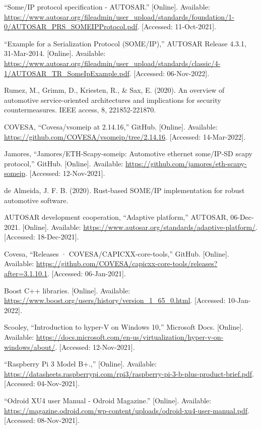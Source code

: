 \documentclass[a4paper, 12pt, oneside, BCOR1cm,toc=chapterentrywithdots]{scrbook}
\begin{document}
\begin{thebibliography}{00}
“Some/IP protocol specification - AUTOSAR.” [Online]. Available: \url{https://www.autosar.org/fileadmin/user\_upload/standards/foundation/1-0/AUTOSAR\_PRS\_SOMEIPProtocol.pdf}. [Accessed: 11-Oct-2021]. 

“Example for a Serialization Protocol (SOME/IP),” AUTOSAR Release 4.3.1, 31-Mar-2014. [Online]. Available: \url{https://www.autosar.org/fileadmin/user\_upload/standards/classic/4-1/AUTOSAR\_TR\_SomeIpExample.pdf}. [Accessed: 06-Nov-2022]. 

Rumez, M., Grimm, D., Kriesten, R., \& Sax, E. (2020). An overview of automotive service-oriented architectures and implications for security countermeasures. IEEE access, 8, 221852-221870.

COVESA, “Covesa/vsomeip at 2.14.16,” GitHub. [Online]. Available: \url{https://github.com/COVESA/vsomeip/tree/2.14.16}. [Accessed: 14-Mar-2022]. 

Jamores, “Jamores/ETH-Scapy-someip: Automotive ethernet some/IP-SD scapy protocol,” GitHub. [Online]. Available: \url{https://github.com/jamores/eth-scapy-someip}. [Accessed: 12-Nov-2021]. 

de Almeida, J. F. B. (2020). Rust-based SOME/IP implementation for robust automotive software.

AUTOSAR development cooperation, “Adaptive platform,” AUTOSAR, 06-Dec-2021. [Online]. Available: \url{https://www.autosar.org/standards/adaptive-platform/}. [Accessed: 18-Dec-2021]. 

Covesa, “Releases · COVESA/CAPICXX-core-tools,” GitHub. [Online]. Available: \url{https://github.com/COVESA/capicxx-core-tools/releases?after=3.1.10.1}. [Accessed: 06-Jan-2021].

Boost C++ libraries. [Online]. Available: \url{https://www.boost.org/users/history/version_1_65_0.html}. [Accessed: 10-Jan-2022].  

Scooley, “Introduction to hyper-V on Windows 10,” Microsoft Docs. [Online]. Available: \url{https://docs.microsoft.com/en-us/virtualization/hyper-v-on-windows/about/}. [Accessed: 12-Nov-2021]. 

“Raspberry Pi 3 Model B+.,”  [Online]. Available: \url{https://datasheets.raspberrypi.com/rpi3/raspberry-pi-3-b-plus-product-brief.pdf}. [Accessed: 04-Nov-2021]. 

“Odroid XU4 user Manual - Odroid Magazine.” [Online]. Available: \url{https://magazine.odroid.com/wp-content/uploads/odroid-xu4-user-manual.pdf}. [Accessed: 08-Nov-2021]. 


\end{thebibliography}
\end{document}
